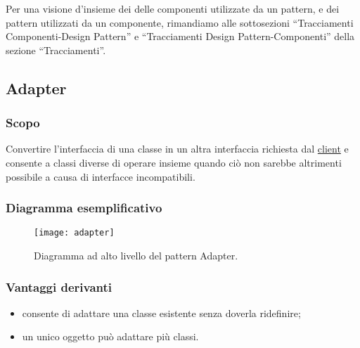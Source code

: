Per una visione d'insieme dei delle componenti utilizzate da un pattern, e dei pattern utilizzati da un componente, rimandiamo alle sottosezioni ``Tracciamenti Componenti-Design Pattern'' e ``Tracciamenti Design Pattern-Componenti'' della sezione ``Tracciamenti''.


\subsection{Adapter}
\subsubsection{Scopo}
Convertire l'interfaccia di una classe in un altra interfaccia richiesta dal \underline{client} e consente a classi diverse di operare insieme quando ciò non sarebbe altrimenti possibile a causa di interfacce incompatibili.
\subsubsection{Diagramma esemplificativo}
\begin{figure}[h]
\centering
\texttt{[image: adapter]}
\caption{Diagramma ad alto livello del pattern Adapter.}\label{fig:adapter}
\end{figure}
\subsubsection{Vantaggi derivanti}
\begin{itemize}
\item consente di adattare una classe esistente senza doverla ridefinire;
\item un unico oggetto può adattare più classi.
\end{itemize}
